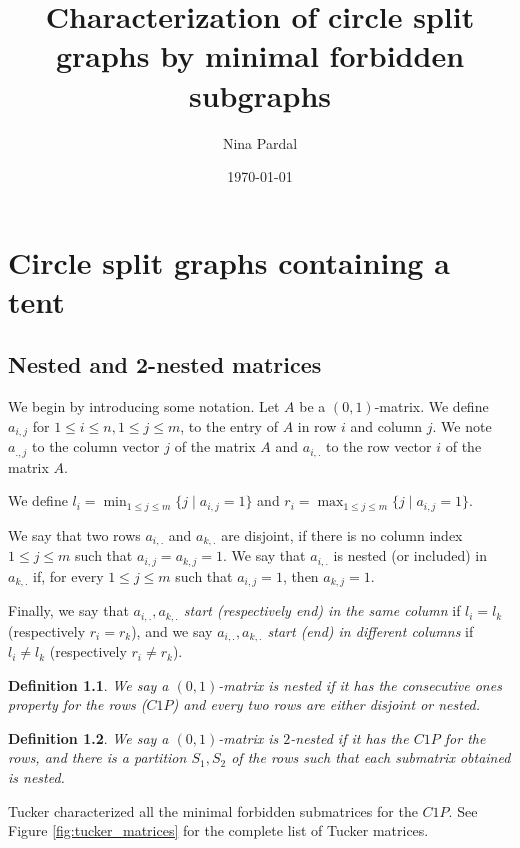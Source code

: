 \documentclass[a4paper,10pt]{report}
\title{Characterization of circle split graphs by minimal forbidden subgraphs}
\author{Nina Pardal}
\date{\today}
\theoremstyle{plain}
\theoremstyle{remark}
\theoremstyle{plain}
\newtheorem{defn}{Definition}[chapter]
\begin{document}
\chapter{Circle split graphs containing a tent}

\section{Nested and 2-nested matrices}

We begin by introducing some notation. Let $A$ be a $(0,1)$-matrix.
We define $a_{i,j}$ for $1 \leq i \leq n, 1 \leq j \leq m$, to the entry of $A$ in row $i$ and column $j$. 
We note $a_{.,j}$ to the column vector $j$ of the matrix $A$ and $a_{i,.}$ to the row vector $i$ of the matrix $A$.
	
We define $l_i = \min_{1 \leq j \leq m} \{ j \mid a_{i,j} = 1 \}$ and $r_i = \max_{1 \leq j \leq m} \{ j \mid a_{i,j} = 1 \}$.
	
We say that two rows $a_{i,.}$ and $a_{k,.}$ are disjoint, if there is no column index $1 \leq j \leq m$ such that $a_{i,j} = a_{k,j} = 1$.
We say that $a_{i,.}$ is nested (or included) in $a_{k,.}$ if, for every $1 \leq j \leq m$ such that $a_{i,j} = 1$, then $a_{k,j} = 1$.
	
Finally, we say that \emph{$a_{i,.}, a_{k,.}$ start (respectively end) in the same column} if $l_i = l_k$ (respectively $r_i = r_k$), 
and we say \emph{$a_{i,.}, a_{k,.}$ start (end) in different columns} if $l_i \neq l_k$ (respectively $r_i \neq r_k$).


\begin{defn} \label{def_nested_matrix}
	We say a $(0,1)$-matrix is \emph{nested} if it has the consecutive ones property for the rows 	($C1P$) and every two rows are either disjoint or nested.
\end{defn}

\begin{defn} \label{def_2nested_matrix}
	We say a $(0,1)$-matrix is \emph{$2$-nested} if it has the $C1P$ for the rows, 
	and there is a partition $S_1, S_2$ of the rows such that each submatrix
	obtained is nested.
\end{defn}

Tucker characterized all the minimal forbidden submatrices for the $C1P$. 
See Figure \ref{fig:tucker_matrices} for the complete list of Tucker matrices.
\end{document}
